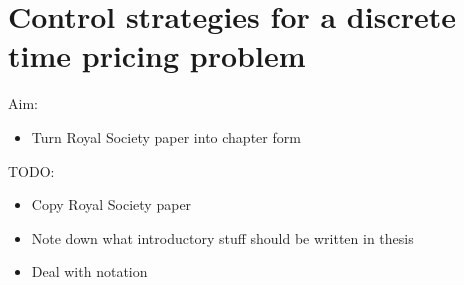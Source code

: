 \documentclass[main.tex]{subfiles}
\begin{document}
\chapter{Control strategies for a discrete time pricing problem}


Aim:
\begin{itemize}
\item Turn Royal Society paper into chapter form
\end{itemize}

TODO:
\begin{itemize}
\item Copy Royal Society paper
\item Note down what introductory stuff should be written in thesis
\item Deal with notation
\end{itemize}

\biblio{} %
\end{document}
